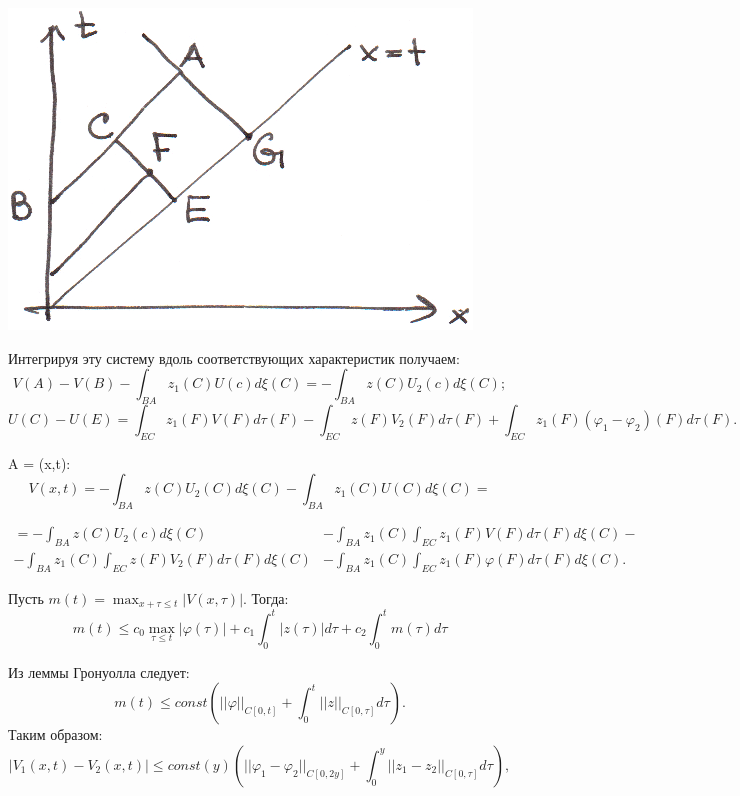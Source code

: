 \documentclass{article}
\begin{document}
\hspace{0.2cm}
\includegraphics[scale=0.8]{pic9_2.png}
\hspace{0.2cm}

Интегрируя эту систему вдоль соответствующих характеристик получаем:
\begin{equation*}
	V(A) - V(B) - \int_{BA} z_1(C) U(c) d \xi(C) = - \int_{BA} z(C) U_2(c) d\xi(C);
\end{equation*}
\begin{equation*}
	U(C) - U(E) = \int_{EC} z_1(F) V(F) d\tau(F) - \int_{EC} z(F) V_2(F) d\tau(F) + \int_{EC} z_1(F) (\varphi_1 - \varphi_2) (F) d\tau(F).
\end{equation*}

A = (x,t):
\begin{equation*}
	V(x,t) = -\int_{BA} z(C) U_2(C) d\xi(C) - \int_{BA} z_1(C) U(C) d\xi(C)=
\end{equation*}

\begin{align*}
	= -\int_{BA} z(C) U_2(c) d\xi(C) 
	&- \int_{BA} z_1(C)\int_{EC} z_1(F) V(F) d\tau(F) d\xi(C) -\\
	- \int_{BA} z_1(C) \int_{EC} z(F) V_2(F) d\tau(F) d\xi(C) 
	&- \int_{BA} z_1(C) \int_{EC} z_1(F) \varphi(F) d\tau(F) d\xi(C).
\end{align*}

Пусть $m(t) = \max_{x + \tau \leqslant t} |V(x,\tau)|$. Тогда:
\begin{equation*}
	m(t) \leqslant c_0 \max_{\tau \leqslant t} |\varphi(\tau)| + c_1 \int_0^t |z(\tau)| d \tau + c_2 \int_0^t m(\tau) d\tau
\end{equation*}

Из леммы Гронуолла следует:
\begin{equation*}
	m(t) \leqslant const(||\varphi||_{C[0,t]}+ \int_0^t ||z||_{C[0,\tau]} d\tau).
\end{equation*}
Таким образом:
\begin{equation*}
	|V_1(x,t) - V_2(x,t)| \leqslant const(y) (||\varphi_1 - \varphi_2||_{C[0,2y]} + \int_0^y ||z_1 - z_2||_{C[0,\tau]} d \tau),
\end{equation*}
\end{document}
